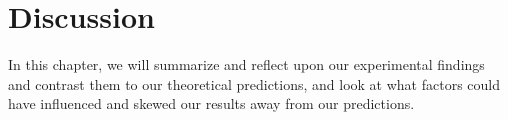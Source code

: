 \chapter{Discussion}
In this chapter, we will summarize and reflect upon our experimental findings
and contrast them to our theoretical predictions, and look at what factors could
have influenced and skewed our results away from our predictions.
